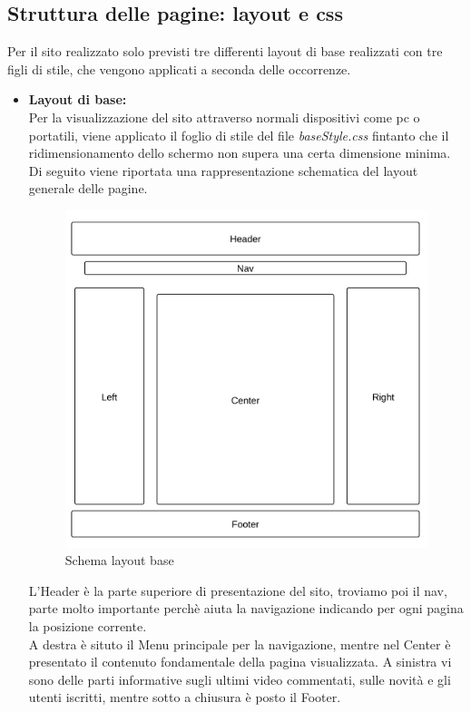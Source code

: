 \subsection{Struttura delle pagine: layout e css}
Per il sito realizzato solo previsti tre differenti layout di base realizzati con tre figli di stile, che vengono applicati a seconda delle occorrenze.

\begin{itemize}

\item \textbf{Layout di base:}\\
Per la visualizzazione del sito attraverso normali dispositivi come pc o portatili, viene applicato il foglio di stile del file \textit{baseStyle.css} fintanto che il ridimensionamento dello schermo non supera una certa dimensione minima.\\
Di seguito viene riportata una rappresentazione schematica del layout generale delle pagine.

\begin{center}
\begin{figure}[H]
\centering
\includegraphics[scale=0.8]{images/baseLayout.png}
\caption{Schema layout base}
\end{figure}
\end{center}

L'Header è la parte superiore di presentazione del sito, troviamo poi il nav, parte molto importante perchè aiuta la navigazione indicando per ogni pagina la posizione corrente.\\
A destra è situto il Menu principale per la navigazione, mentre nel Center è presentato il contenuto fondamentale della pagina visualizzata. A sinistra vi sono delle parti informative sugli ultimi video commentati, sulle novità e gli utenti iscritti, mentre sotto a chiusura è posto il Footer.



\end{itemize}

